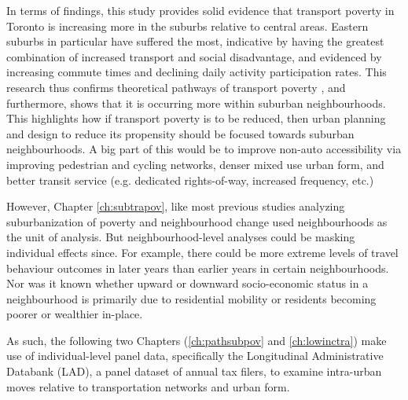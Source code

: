 In terms of findings, this study provides solid evidence that transport poverty in Toronto is increasing more in the suburbs relative to central areas. Eastern suburbs in particular have suffered the most, indicative by having the greatest combination of increased transport and social disadvantage, and evidenced by increasing commute times and declining daily activity participation rates. This research thus confirms theoretical pathways of transport poverty \cite{lucas_transport_2012}, and furthermore, shows that it is occurring more within suburban neighbourhoods. This highlights how if transport poverty is to be reduced, then urban planning and design to reduce its propensity should be focused towards suburban neighbourhoods. A big part of this would be to improve non-auto accessibility via improving pedestrian and cycling networks, denser mixed use urban form, and better transit service (e.g. dedicated rights-of-way, increased frequency, etc.)

However, Chapter \ref{ch:subtrapov}, like most previous studies analyzing suburbanization of poverty and neighbourhood change \cite{ades_are_2012,breau_pulling_2018,grant_changing_2020} used neighbourhoods as the unit of analysis. But neighbourhood-level analyses could be masking individual effects since. For example, there could be more extreme levels of travel behaviour outcomes in later years than earlier years in certain neighbourhoods. Nor was it known whether upward or downward socio-economic status in a neighbourhood is primarily due to residential mobility or residents becoming poorer or wealthier in-place.

As such, the following two Chapters (\ref{ch:pathsubpov} and \ref{ch:lowinctra}) make use of individual-level panel data, specifically the Longitudinal Administrative Databank (LAD), a panel dataset of annual tax filers, to examine intra-urban moves relative to transportation networks and urban form.

